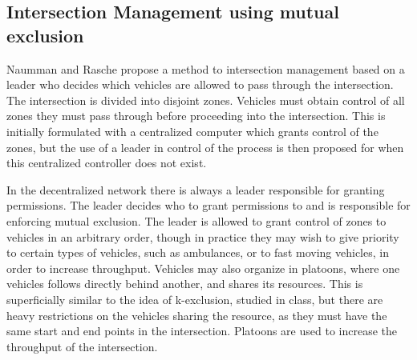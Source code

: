 \documentclass[12pt]{article}
\begin{document}
\subsection{Intersection Management using mutual exclusion}
\label{sec:tokenRing}
Naumman and Rasche propose a method to intersection management based on a leader who decides which vehicles are allowed to pass through the intersection. The intersection is divided into disjoint zones. Vehicles must obtain control of all zones they must pass through before proceeding into the intersection. This is initially formulated with a centralized computer which grants control of the zones, but the use of a leader in control of the process is then proposed for when this centralized controller does not exist.\par
In the decentralized network there is always a leader responsible for granting permissions. The leader decides who to grant permissions to and is responsible for enforcing mutual exclusion. The leader is allowed to grant control of zones to vehicles in an arbitrary order, though in practice they may wish to give priority to certain types of vehicles, such as ambulances, or to fast moving vehicles, in order to increase throughput. Vehicles may also organize in platoons, where one vehicles follows directly behind another, and shares its resources. This is superficially similar to the idea of k-exclusion, studied in class, but there are heavy restrictions on the vehicles sharing the resource, as they must have the same start and end points in the intersection. Platoons are used to increase the throughput of the intersection.
\end{document}
